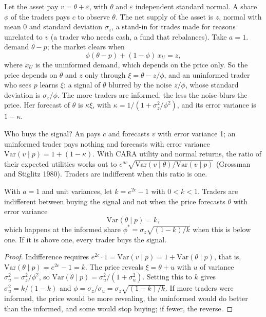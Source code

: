 Let the asset pay $v = \theta + \varepsilon$, with $\theta$ and $\varepsilon$ independent standard normal.
A share $\phi$ of the traders pays $c$ to observe $\theta$. The net supply of the asset is $z$, normal with
mean 0 and standard deviation $\sigma_z$, a stand-in for trades made for reasons unrelated to $v$
(a trader who needs cash, a fund that rebalances). Take $a = 1$.  demand $\theta - p$; the
market clears when
\[
\phi(\theta - p) + (1 - \phi)\,x_U = z ,
\]
where $x_U$ is the uninformed demand, which depends on the price only. So the price depends on $\theta$ and
$z$ only through $\xi = \theta - z/\phi$, and an uninformed trader who sees $p$ learns $\xi$: a signal of
$\theta$ blurred by the noise $z/\phi$, whose standard deviation is $\sigma_z/\phi$. The more traders are
informed, the less the noise blurs the price. Her forecast of $\theta$ is $\kappa\xi$, with $\kappa = 1/(1 +
\sigma_z^2/\phi^2)$, and its error variance is $1 - \kappa$.

Who buys the signal? An  pays $c$ and forecasts $v$ with error variance 1; an uninformed
trader pays nothing and forecasts with error variance $\mathrm{Var}(v \mid p) = 1 + (1 - \kappa)$. With CARA
utility and normal returns, the ratio of their expected utilities works out to $e^{ac}\sqrt{\mathrm{Var}(v
\mid \theta)/\mathrm{Var}(v \mid p)}$ (Grossman and Stiglitz 1980). Traders are indifferent when this ratio
is one.

\begin{proposition}\label{prop:b2:prices-as-information:share}
With $a = 1$ and unit variances, let $k = e^{2c} - 1$ with $0 < k < 1$. Traders are indifferent between
buying the signal and not when the price forecasts $\theta$ with error variance
\[
\mathrm{Var}(\theta \mid p) = k ,
\]
which happens at the informed share $\phi^* = \sigma_z\sqrt{(1 - k)/k}$ when this is below one. If it is
above one, every trader buys the signal.
\end{proposition}

\begin{proof}
Indifference requires $e^{2c}\cdot 1 = \mathrm{Var}(v \mid p) = 1 + \mathrm{Var}(\theta \mid p)$, that is,
$\mathrm{Var}(\theta \mid p) = e^{2c} - 1 = k$. The price reveals $\xi = \theta + u$ with $u$ of variance
$\sigma_u^2 = \sigma_z^2/\phi^2$, so $\mathrm{Var}(\theta \mid p) = \sigma_u^2/(1 + \sigma_u^2)$. Setting this to
$k$ gives $\sigma_u^2 = k/(1 - k)$ and $\phi = \sigma_z/\sigma_u = \sigma_z\sqrt{(1 - k)/k}$. If more traders
were informed, the price would be more revealing, the uninformed would do better than the informed, and
some would stop buying; if fewer, the reverse.
\end{proof}

